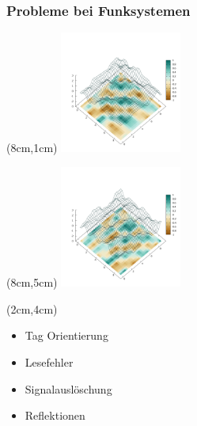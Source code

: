 \begin{frame} %
  	\frametitle{Probleme bei Funksystemen}
	\begin{textblock*}{4cm}(8cm,1cm) %
		\centering
  		\includegraphics[width=4cm]{../img/Plate0_A1.png}
  	\end{textblock*}
%  	
	\begin{textblock*}{4cm}(8cm,5cm) %
		\centering
  		\includegraphics[width=4cm]{../img/Plate0_A4.png}
  	\end{textblock*}
%  	
	\begin{textblock*}{4cm}(2cm,4cm) %
  			\begin{itemize}
  				\item Tag Orientierung
  				\item Lesefehler
   				\item Signalauslöschung
   				\item Reflektionen
  		  	\end{itemize}
  	\end{textblock*}
\end{frame}
